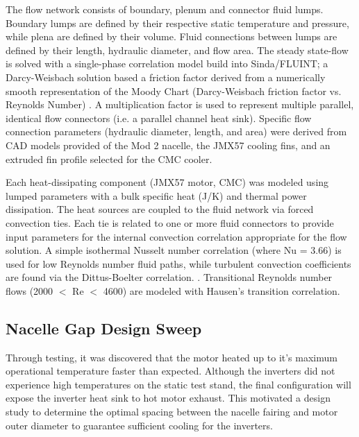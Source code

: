 \documentclass[]{aiaa-tc}%
\begin{document}
The flow network consists of boundary, plenum and connector fluid lumps.  Boundary lumps are defined by their respective static temperature and pressure, while plena are defined by their volume.  Fluid connections between lumps are defined by their length, hydraulic diameter, and flow area.  The steady state-flow is solved with a single-phase correlation model build into Sinda/FLUINT; a Darcy-Weisbach solution based a friction factor derived from a numerically smooth representation of the Moody Chart  (Darcy-Weisbach friction factor vs. Reynolds Number) \cite{CRtech_2013}.  A multiplication factor is used to represent multiple parallel, identical flow connectors (i.e. a parallel channel heat sink).  Specific flow connection parameters (hydraulic diameter, length, and area) were derived from CAD models provided of the Mod 2 nacelle, the JMX57 cooling fins, and an extruded fin profile selected for the CMC cooler.  

Each heat-dissipating component (JMX57 motor, CMC) was modeled using lumped parameters with a bulk specific heat (J/K) and thermal power dissipation.  The heat sources are coupled to the fluid network via forced convection ties.  Each tie is related to one or more fluid connectors to provide input parameters for the internal convection correlation appropriate for the flow solution.  A simple isothermal Nusselt number correlation (where Nu = 3.66) is used for low Reynolds number fluid paths, while turbulent convection coefficients are found via the Dittus-Boelter correlation. \cite{CRtech_2015}.  Transitional Reynolds number flows (2000 $<$ Re $<$ 4600) are modeled with Hausen’s transition correlation. \cite{Kays}


\subsection{Nacelle Gap Design Sweep}

Through testing, it was discovered that the motor heated up to it's maximum operational temperature faster than expected. Although the inverters did not experience high temperatures on the static test stand, the final configuration will expose the inverter heat sink to hot motor exhaust. This motivated a design study to determine the optimal spacing between the nacelle fairing and motor outer diameter to guarantee sufficient cooling for the inverters.
\end{document}
